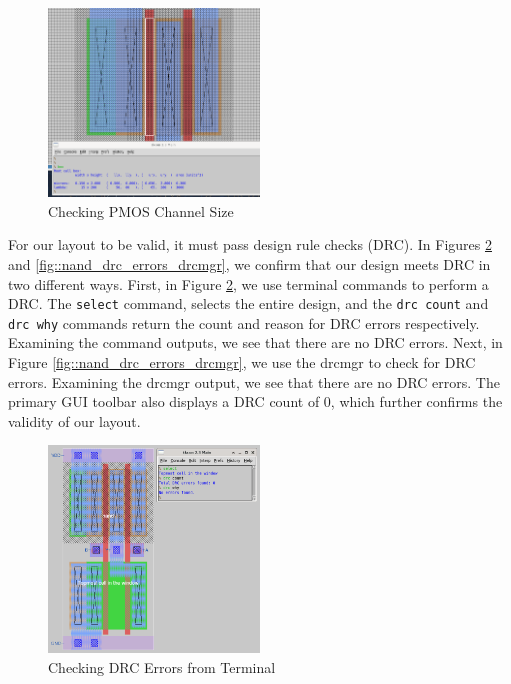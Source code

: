\documentclass{article}
\begin{document}
	\begin{figure}[H]
		\centerline{\includegraphics[width=0.5\textwidth]{nand_pmos_channel_sizing.png}}
		\caption{Checking PMOS Channel Size}
		\label{fig::nand_pmos_channel_sizing}
	\end{figure}
	
	For our layout to be valid, it must pass design rule checks (DRC). In Figures \ref{fig::nand_drc_errors_terminal} and \ref{fig::nand_drc_errors_drcmgr}, we confirm that our design meets DRC in two different ways. First, in Figure \ref{fig::nand_drc_errors_terminal}, we use terminal commands to perform a DRC. The \texttt{select} command, selects the entire design, and the \texttt{drc count} and \texttt{drc why} commands return the count and reason for DRC errors respectively. Examining the command outputs, we see that there are no DRC errors. Next, in Figure \ref{fig::nand_drc_errors_drcmgr}, we use the drcmgr to check for DRC errors. Examining the drcmgr output, we see that there are no DRC errors. The primary GUI toolbar also displays a DRC count of 0, which further confirms the validity of our layout.
	
	\begin{figure}[H]
		\centerline{\includegraphics[width=0.5\textwidth]{nand_drc_errors_terminal.png}}
		\caption{Checking DRC Errors from Terminal}
		\label{fig::nand_drc_errors_terminal}
	\end{figure}
	
\end{document}
